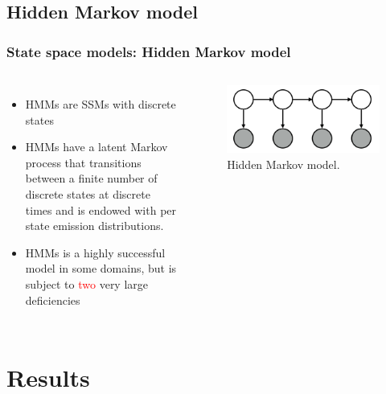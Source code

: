 \documentclass[aspectratio=169]{beamer}
\begin{document}
\subsection{Hidden Markov model}
\begin{frame}
    \frametitle{State space models: Hidden Markov model}


    \begin{columns}[c] 


        \begin{itemize}
            \item HMMs are SSMs with discrete states
            \item HMMs have a latent Markov process that transitions between a finite number of discrete states at discrete times and is endowed with per state emission distributions.
            \item HMMs is a highly successful model in some domains, but is subject to \textcolor{red}{two} very large deficiencies
        \end{itemize}


        \begin{figure}
            \includegraphics[width=1.0\linewidth]{hmm.png}
            \caption{Hidden Markov model.}
        \end{figure}

    \end{columns}

\end{frame}


\section{Results}
\end{document}
